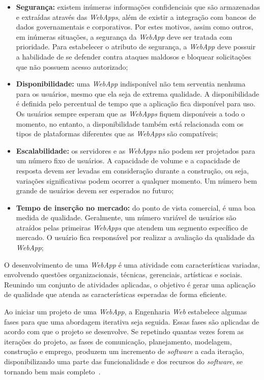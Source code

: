 \begin{itemize}
	
	\item \textbf{Segurança:} existem inúmeras informações confidenciais que são armazenadas e extraídas através das \textit{WebApps}, além de existir a integração com bancos de dados governamentais e corporativos. Por estes motivos, assim como outros, em inúmeras situações, a segurança da \textit{WebApp} deve ser tratada com prioridade. Para estabelecer o atributo de segurança, a \textit{WebApp} deve possuir a habilidade de se defender contra ataques maldosos e bloquear solicitações que não possuem acesso autorizado;
	
	\item \textbf{Disponibilidade:} uma \textit{WebApp} indisponível não tem serventia nenhuma para os usuários, mesmo que ela seja de extrema qualidade. A disponibilidade é definida pelo percentual de tempo que a aplicação fica disponível para uso. Os usuários sempre esperam que as \textit{WebApps} fiquem disponíveis a todo o momento, no entanto, a disponibilidade também está relacionada com os tipos de plataformas diferentes que as \textit{WebApps} são compatíveis;

	\item \textbf{Escalabilidade:} os servidores e as \textit{WebApps} não podem ser projetados para um número fixo de usuários. A capacidade de volume e a capacidade de resposta devem ser levadas em consideração durante a construção, ou seja, variações significativas podem ocorrer a qualquer momento. Um número bem grande de usuários devem ser esperados no futuro;

	\item \textbf{Tempo de inserção no mercado:} do ponto de vista comercial, é uma boa medida de qualidade. Geralmente, um número variável de usuários são atraídos pelas primeiras \textit{WebApps} que atendem um segmento específico de mercado. O usuário fica responsável por realizar a avaliação da qualidade da \textit{WebApp};

\end{itemize}

O desenvolvimento de uma \textit{WebApp} é uma atividade com características variadas, envolvendo questões organizacionais, técnicas, gerenciais, artísticas e sociais. Reunindo um conjunto de atividades aplicadas, o objetivo é gerar uma aplicação de qualidade que atenda as características esperadas de forma eficiente.

Ao iniciar um projeto de uma \textit{WebApp}, a Engenharia \textit{Web} estabelece algumas fases para que uma abordagem iterativa seja seguida. Essas fases são aplicadas de acordo com que o projeto se desenvolve. Se repetindo quantas vezes forem as iterações do projeto, as fases de comunicação, planejamento, modelagem, construção e emprego, produzem um incremento de \textit{software} a cada iteração, disponibilizando uma parte das funcionalidade e dos recursos do \textit{software}, se tornando bem mais completo~\cite{pressman:es11}.

